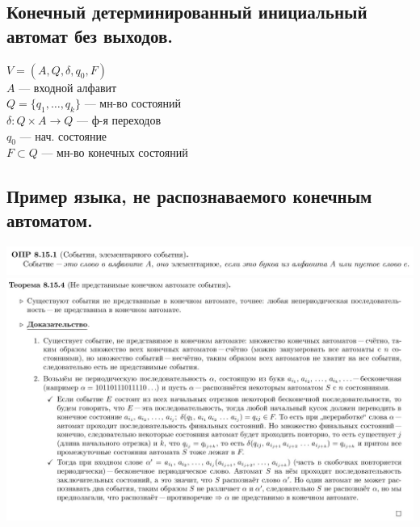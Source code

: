 \documentclass[12pt]{article}
\begin{document}
\subsection{Конечный детерминированный инициальный автомат без выходов.}
	$V = (A, Q, \delta, q_0, F)$\\
	$A$ — входной алфавит\\
	$Q = \{q_1, \dotsc, q_k\}$ — мн-во состояний\\
	$\delta: Q \times A \to Q$ — ф-я переходов\\
	$q_0$ — нач. состояние\\
	$F \subset Q$ — мн-во конечных состояний
\subsection{Пример языка, не распознаваемого конечным автоматом.}
	\includegraphics[width=500pt]{51}\\
	\includegraphics[width=500pt]{52}
\end{document}
